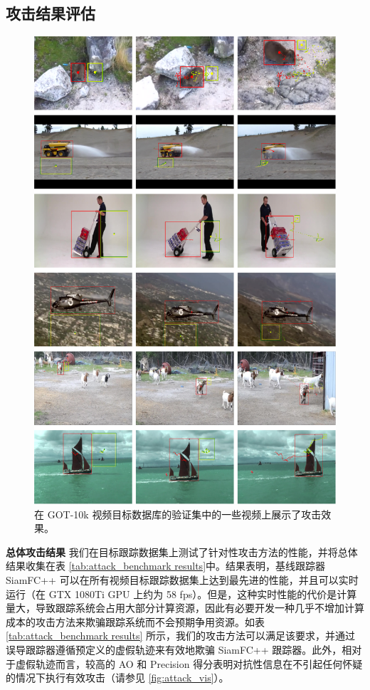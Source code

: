 \subsection{攻击结果评估}
\begin{figure}[p]
\centering
\includegraphics[width=1.0\textwidth]{Img/attack/txt_visualize.pdf}
\caption{在 GOT-10k \cite{GOT-10k} 视频目标数据库的验证集中的一些视频上展示了攻击效果。}
\end{figure}

\textbf{总体攻击结果} 我们在目标跟踪数据集上测试了针对性攻击方法的性能，并将总体结果收集在表 \ref{tab:attack_benchmark results}中。结果表明，基线跟踪器 SiamFC++ 可以在所有视频目标跟踪数据集上达到最先进的性能，并且可以实时运行（在 GTX 1080Ti GPU 上约为 58 fps）。但是，这种实时性能的代价是计算量大，导致跟踪系统会占用大部分计算资源，因此有必要开发一种几乎不增加计算成本的攻击方法来欺骗跟踪系统而不会预期争用资源。如表 \ref{tab:attack_benchmark results} 所示，我们的攻击方法可以满足该要求，并通过误导跟踪器遵循预定义的虚假轨迹来有效地欺骗 SiamFC++ 跟踪器。此外，相对于虚假轨迹而言，较高的 AO 和 Precision 得分表明对抗性信息在不引起任何怀疑的情况下执行有效攻击（请参见 \ref{fig:attack_vis}）。

